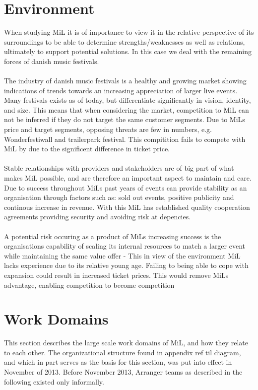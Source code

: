 \section{Environment}
When studying MiL it is of importance to view it in the relative perspective of its surroundings to be able to determine strengths/weaknesses as well as relations, ultimately to support potential solutions. In this case we deal with the remaining forces of danish music festivals.
\\  \\
The industry of danish music festivals is a healthy and growing market showing indications of trends towards an increasing appreciation of larger live events. Many festivals exists as of today, but differentiate significantly in vision, identity, and size. This means that when considering the market, competition to MiL can not be inferred if they do not target the same customer segments. Due to MiLs price and target segments, opposing threats are few in numbers, e.g. Wonderfestiwall and trailerpark festival. This compitition fails to compete with MiL by due to the significent difference in ticket price.
\\  \\
Stable relationships with providers and stakeholders are of big part of what makes MiL possible, and are therefore an important aspect to maintain and care. Due to success throughout MiLs past years of events can provide stability as an organisation through factors such as: sold out events, positive publicity and continous increase in revenue. With this MiL has established quality cooperation agreements providing security and avoiding risk at depencies.
\\  \\
A potential risk occuring as a product of MiLs increasing success is the organisations capability of scaling its internal resources to match a larger event while maintaining the same value offer - This in view of the environment MiL lacks experience due to its relative young age. Failing to being able to cope with expansion could result in increased ticket prices. This would remove MiLs advantage, enabling competition to become competition


\section{Work Domains}
\label{sec:work_domains}
This section describes the large scale work domains of MiL, and how they relate to each other. The organizational structure found in appendix ref til diagram, and which in part serves as the basis for this section, was put into effect in November of 2013. Before November 2013, Arranger teams as described in the following existed only informally.

